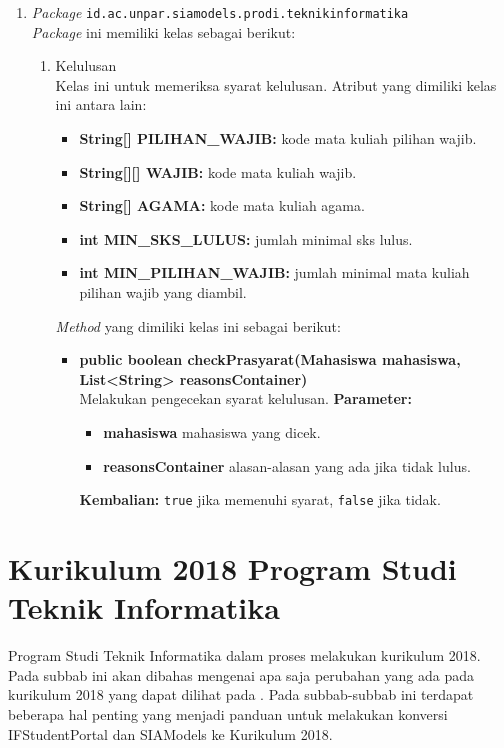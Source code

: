 \begin{enumerate}
\begin{table}[H]
	\label{tab:3_kelas_matakuliah}
\end{table}
	\item \textit{Package} \texttt{id.ac.unpar.siamodels.prodi.teknikinformatika}\\
	\textit{Package} ini memiliki kelas sebagai berikut:
	\begin{enumerate}
		\item Kelulusan\\
		Kelas ini untuk memeriksa syarat kelulusan. Atribut yang dimiliki kelas ini antara lain:
		\begin{itemize}
			\item \textbf{String[] PILIHAN\_WAJIB:} kode mata kuliah pilihan wajib.
			\item \textbf{String[][] WAJIB:} kode mata kuliah wajib.
			\item \textbf{String[] AGAMA:} kode mata kuliah agama.
			\item \textbf{int MIN\_SKS\_LULUS:} jumlah minimal sks lulus.
			\item \textbf{int MIN\_PILIHAN\_WAJIB:} jumlah minimal mata kuliah pilihan wajib yang diambil.
		\end{itemize}
		\textit{Method} yang dimiliki kelas ini sebagai berikut:
		\begin{itemize}
			\item \textbf{public boolean checkPrasyarat(Mahasiswa mahasiswa, List<String> reasonsContainer)}\\
			Melakukan pengecekan syarat kelulusan.
			\textbf{Parameter:}
			\begin{itemize}
				\item \textbf{mahasiswa} mahasiswa yang dicek.
				\item \textbf{reasonsContainer} alasan-alasan yang ada jika tidak lulus.
			\end{itemize}
			\textbf{Kembalian:} \texttt{true} jika memenuhi syarat, \texttt{false} jika tidak.
		\end{itemize}
	\end{enumerate}
\end{enumerate}

\section{Kurikulum 2018 Program Studi Teknik Informatika}
\label{sec:kurikulum2018}

Program Studi Teknik Informatika dalam proses melakukan kurikulum 2018. Pada subbab ini akan dibahas mengenai apa saja perubahan yang ada pada kurikulum 2018 yang dapat dilihat pada \cite{dokumenkurikulum2018}. Pada subbab-subbab ini terdapat beberapa hal penting yang menjadi panduan untuk melakukan konversi IFStudentPortal dan SIAModels ke Kurikulum 2018.

